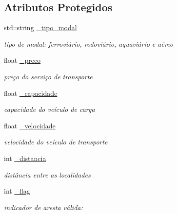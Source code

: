 \subsection*{Atributos Protegidos}
\begin{DoxyCompactItemize}
\item 
\mbox{\label{classModal_aef40834202f0fe655d4c1d3478a41d0f}} 
std\+::string \hyperlink{classModal_aef40834202f0fe655d4c1d3478a41d0f}{\+\_\+tipo\+\_\+modal}
\begin{DoxyCompactList}\small\item\em tipo de modal\+: ferroviário, rodoviário, aquaviário e aéreo \end{DoxyCompactList}\item 
\mbox{\label{classModal_a487c4263e492750fbaac789e0e3feef3}} 
float \hyperlink{classModal_a487c4263e492750fbaac789e0e3feef3}{\+\_\+preco}
\begin{DoxyCompactList}\small\item\em preço do serviço de transporte \end{DoxyCompactList}\item 
\mbox{\label{classModal_a61a2da94d2f76fc7f761928d78d51196}} 
float \hyperlink{classModal_a61a2da94d2f76fc7f761928d78d51196}{\+\_\+capacidade}
\begin{DoxyCompactList}\small\item\em capacidade do veículo de carga \end{DoxyCompactList}\item 
\mbox{\label{classModal_adebafa0b04fbf2c065bb6ebcf84f1524}} 
float \hyperlink{classModal_adebafa0b04fbf2c065bb6ebcf84f1524}{\+\_\+velocidade}
\begin{DoxyCompactList}\small\item\em velocidade do veículo de transporte \end{DoxyCompactList}\item 
\mbox{\label{classModal_a39f95d6378c8794c91bca2efbbf11337}} 
int \hyperlink{classModal_a39f95d6378c8794c91bca2efbbf11337}{\+\_\+distancia}
\begin{DoxyCompactList}\small\item\em distância entre as localidades \end{DoxyCompactList}\item 
int \hyperlink{classModal_a16ceb7e80a80e658c438afe79da01f09}{\+\_\+flag}
\begin{DoxyCompactList}\small\item\em indicador de aresta válida\+: \end{DoxyCompactList}\end{DoxyCompactItemize}


